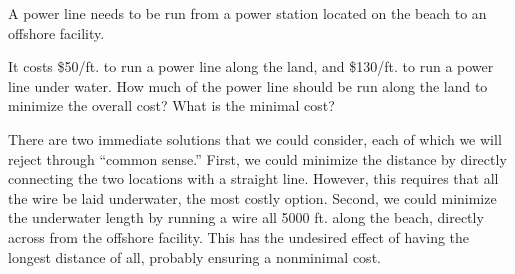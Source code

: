 \documentclass{ximera}
\begin{document}
\begin{example}
  A power line needs to be run from a power station located on the
  beach to an offshore facility.
  \begin{image}
  \end{image}
  It costs \$50/ft. to run a power line along the land, and \$130/ft. to
  run a power line under water. How much of the power line should be run
  along the land to minimize the overall cost? What is the minimal cost?
  \begin{explanation}
    There are two immediate solutions that we could consider, each of
    which we will reject through ``common sense.'' First, we could
    minimize the distance by directly connecting the two locations with a
    straight line. However, this requires that all the wire be laid
    underwater, the most costly option. Second, we could minimize the
    underwater length by running a wire all 5000 ft. along the beach,
    directly across from the offshore facility. This has the undesired
    effect of having the longest distance of all, probably ensuring a
    nonminimal cost.
    

\end{explanation}
\end{example}
\end{document}
